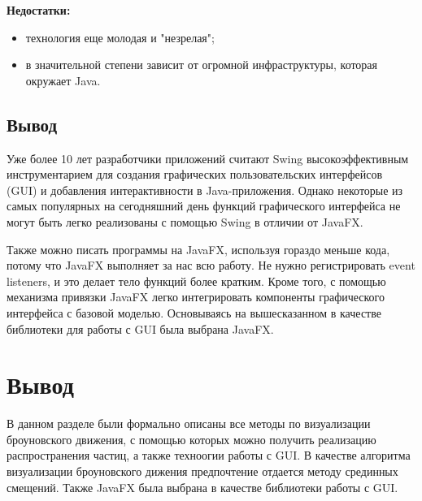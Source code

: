 \textbf{Недостатки:} 
\begin{itemize}
    \item технология еще молодая и "незрелая";
    \item в значительной степени зависит от огромной инфраструктуры, которая окружает Java.
\end{itemize}



\subsection*{Вывод}

Уже более 10 лет разработчики приложений считают Swing высокоэффективным инструментарием для создания графических пользовательских интерфейсов (GUI) и добавления интерактивности в Java-приложения. Однако некоторые из самых популярных на сегодняшний день функций графического интерфейса не могут быть легко реализованы с помощью Swing в отличии от JavaFX. 

Также можно писать программы на JavaFX, используя гораздо меньше кода, потому что JavaFX выполняет за нас всю работу. Не нужно регистрировать event listeners, и это делает тело функций более кратким. Кроме того, с помощью механизма привязки JavaFX легко интегрировать компоненты графического интерфейса с базовой моделью. Основываясь на вышесказанном в качестве библиотеки для работы с GUI была выбрана JavaFX.

\section*{Вывод}

В данном разделе были формально описаны все методы по визуализации броуновского движения, с помощью которых можно получить реализацию распространения частиц, а также техноогии работы с GUI. В качестве алгоритма визуализации броуновского дижения предпочтение отдается методу срединных смещений. Также JavaFX была выбрана в качестве библиотеки работы с GUI.

